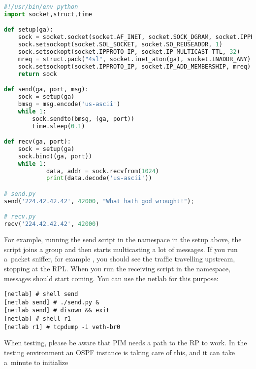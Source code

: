 \begin{lstlisting}[language=python]
#!/usr/bin/env python
import socket,struct,time

def setup(ga):
    sock = socket.socket(socket.AF_INET, socket.SOCK_DGRAM, socket.IPPROTO_UDP)
    sock.setsockopt(socket.SOL_SOCKET, socket.SO_REUSEADDR, 1)
    sock.setsockopt(socket.IPPROTO_IP, socket.IP_MULTICAST_TTL, 32)
    mreq = struct.pack("4sl", socket.inet_aton(ga), socket.INADDR_ANY)
    sock.setsockopt(socket.IPPROTO_IP, socket.IP_ADD_MEMBERSHIP, mreq)
    return sock

def send(ga, port, msg):
    sock = setup(ga)
    bmsg = msg.encode('us-ascii')
    while 1:
        sock.sendto(bmsg, (ga, port))
        time.sleep(0.1)

def recv(ga, port):
    sock = setup(ga)
    sock.bind((ga, port))
    while 1:
            data, addr = sock.recvfrom(1024)
            print(data.decode('us-ascii'))

# send.py
send('224.42.42.42', 42000, "What hath god wrought!");

# recv.py
recv('224.42.42.42', 42000)
\end{lstlisting}

\noindent For example, running the send script in the  namespace in the setup
above, the script joins a group and then starts multicasting a lot of messages.
If you run a~packet sniffer, for example , you should see the traffic
travelling upstream, stopping at the RPL. When you run the receiving script in
the  namespace, messages should start coming. You can use the netlab
for this purpose:

\begin{lstlisting}
[netlab] # shell send
[netlab send] # ./send.py &
[netlab send] # disown && exit
[netlab] # shell r1
[netlab r1] # tcpdump -i veth-br0
\end{lstlisting}

\noindent When testing, please be aware that PIM needs a path to the RP to work. In the
testing environment an OSPF instance is taking care of this, and it can take
a~minute to initialize
